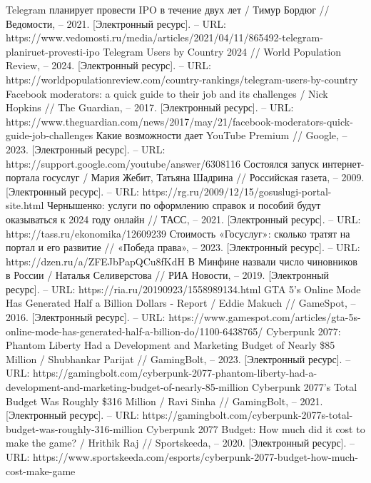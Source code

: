\documentclass{article}
\begin{document}
\begin{thebibliography}{2}
 Telegram планирует провести IPO в течение двух лет / Тимур Бордюг // Ведомости, – 2021. [Электронный ресурс]. – URL: https://www.vedomosti.ru/media/articles/2021/04/11/865492-telegram-planiruet-provesti-ipo
 Telegram Users by Country 2024 // World Population Review, – 2024. [Электронный ресурс]. – URL: https://worldpopulationreview.com/country-rankings/telegram-users-by-country
 Facebook moderators: a quick guide to their job and its challenges / Nick Hopkins // The Guardian, – 2017. [Электронный ресурс]. – URL: https://www.theguardian.com/news/2017/may/21/facebook-moderators-quick-guide-job-challenges
 Какие возможности дает YouTube Premium // Google, – 2023. [Электронный ресурс]. – URL: https://support.google.com/youtube/answer/6308116
 Состоялся запуск интернет-портала госуслуг / Мария Жебит, Татьяна Шадрина // Российская газета, – 2009. [Электронный ресурс]. – URL: https://rg.ru/2009/12/15/gosuslugi-portal-site.html
 Чернышенко: услуги по оформлению справок и пособий будут оказываться к 2024 году онлайн // ТАСС, – 2021. [Электронный ресурс]. – URL: https://tass.ru/ekonomika/12609239
 Стоимость «Госуслуг»: сколько тратят на портал и его развитие // «Победа права», – 2023. [Электронный ресурс]. – URL: https://dzen.ru/a/ZFEJbPapQCu8fKdH
 В Минфине назвали число чиновников в России / Наталья Селиверстова // РИА Новости, – 2019. [Электронный ресурс]. – URL: https://ria.ru/20190923/1558989134.html
 GTA 5's Online Mode Has Generated Half a Billion Dollars - Report / Eddie Makuch // GameSpot, – 2016. [Электронный ресурс]. – URL: https://www.gamespot.com/articles/gta-5s-online-mode-has-generated-half-a-billion-do/1100-6438765/
 Cyberpunk 2077: Phantom Liberty Had a Development and Marketing Budget of Nearly \$85 Million / Shubhankar Parijat // GamingBolt, – 2023. [Электронный ресурс]. – URL: https://gamingbolt.com/cyberpunk-2077-phantom-liberty-had-a-development-and-marketing-budget-of-nearly-85-million
 Cyberpunk 2077’s Total Budget Was Roughly \$316 Million / Ravi Sinha // GamingBolt, – 2021. [Электронный ресурс]. – URL: https://gamingbolt.com/cyberpunk-2077s-total-budget-was-roughly-316-million
 Cyberpunk 2077 Budget: How much did it cost to make the game? / Hrithik Raj // Sportskeeda, – 2020. [Электронный ресурс]. – URL: https://www.sportskeeda.com/esports/cyberpunk-2077-budget-how-much-cost-make-game

\end{thebibliography}
\end{document}
